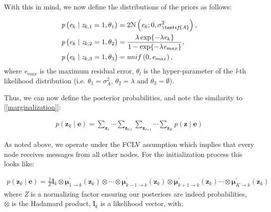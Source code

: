 \documentclass{article}
\begin{document}
With this in mind, we now define the distributions of the priors as follows: 

\begin{equation}\label{prior distributions}
    \begin{aligned}
        \textit{p}\left(\textit{e$_k$}\mid\textit{z$_{k,1}$} = 1, \textit{$\theta_1$}\right) &= 2\mathcal{N}\left(\textit{e$_k$}; 0,\textit{$\sigma^2_\textif{A}$} \right),\\
        \textit{p}\left(\textit{e$_k$}\mid\textit{z$_{k,2}$} = 1, \textit{$\theta_2$}\right) &= \frac{\lambda\exp\{-\lambda\textit{e$_k$}\}}{1 - \exp\{-\lambda\textit{e$_{max}$}\}},\\
        \textit{p}\left(\textit{e$_k$}\mid\textit{z$_{k,3}$} = 1, \textit{$\theta_3$}\right) &= unif\left(0,\textit{e$_{max}$}\right),
    \end{aligned}
\end{equation} where \textit{e$_{max}$} is the maximum residual error, \textit{$\theta_l$} is the hyper-parameter of the \textit{l}-th likelihood distribution (i.e. $\textit{$\theta_1$} = \sigma^2_A$, $\textit{$\theta_2$} = \textit{$\lambda$}$ and $\textit{$\theta_3$} = \emptyset$).

Thus, we can now define the posterior probabilities, and note the similarity to [\ref{marginalization}]:

\begin{equation} \label{posterior_approx}
    \begin{aligned}
        \textit{p}\left(\textbf{z$_\textit{k}$}\mid\textbf{e}\right) = \sum_\textbf{z$_\textit{1}$}\cdots\sum_\textbf{z$_\textit{k-1}$}\sum_\textbf{z$_\textit{k+1}$}\cdots\sum_\textbf{z$_\textit{K}$}\textit{p}\left(\textbf{z}\mid\textbf{e} \right)
    \end{aligned}
\end{equation}

As noted above, we operate under the FCLV assumption which implies that every node receives messages from all other nodes. For the initialization process this looks like:

\begin{equation} \label{fclv_initPosterior}
    \begin{aligned}
        \textit{p}\left(\textbf{z$_k$}\mid\textbf{e}\right) = \frac{1}{\textit{Z}}\textbf{l$_\textit{k}$} \otimes \pmb{\mu}^\prime_{1 \rightarrow{\textit{k}}}\left(\textbf{z$_k$}\right) \otimes \cdots \otimes \pmb{\mu}^\prime_{k-1 \rightarrow{\textit{k}}}\left(\textbf{z$_k$}\right)\otimes \pmb{\mu}^\prime_{k+1 \rightarrow{\textit{k}}}\left(\textbf{z$_k$}\right) \cdots \otimes \pmb{\mu}^\prime_{K \rightarrow{\textit{k}}}\left(\textbf{z$_k$}\right)
    \end{aligned}
\end{equation} where \textit{Z} is a normalizing factor ensuring our posteriors are indeed probabilities, $\otimes$ is the Hadamard product, \textbf{l$_\textit{k}$} is a likelihood vector, with:
\end{document}
